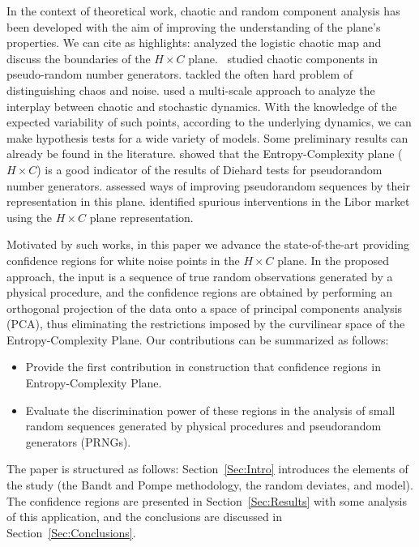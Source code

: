 
In the context of theoretical work, chaotic and random component analysis has been developed with the aim of improving the understanding of the plane's properties. We can cite as highlights:
 analyzed the logistic chaotic map and discuss the boundaries of the $H \times C$ plane.~\citeyear{De_Micco_2009} studied chaotic components in pseudo-random number generators.
  tackled the often hard problem of distinguishing chaos and noise.
 used a multi-scale approach to analyze the interplay between chaotic and stochastic dynamics.
With the knowledge of the expected variability of such points, according to the underlying dynamics, we can make hypothesis tests for a wide variety of models.
Some preliminary results can already be found in the literature.
 showed that the Entropy-Complexity plane ($H\times C$) is a good indicator of the results of Diehard tests for pseudorandom number generators.
 assessed ways of improving pseudorandom sequences by their representation in this plane.
 identified spurious interventions in the Libor market using the $H\times C$ plane representation.

Motivated by such works, in this paper we advance the state-of-the-art providing confidence regions for white noise points in the $H\times C$ plane.
In the proposed approach, the input is a sequence of true random observations generated by a physical procedure, and the confidence regions are obtained by performing an orthogonal projection of the data onto a space of principal components analysis (PCA), thus eliminating the restrictions imposed by the curvilinear space of the Entropy-Complexity Plane.
Our contributions can be summarized as follows:
\begin{itemize}
    \item Provide the first contribution in construction that confidence regions in Entropy-Complexity Plane.
    \item Evaluate the discrimination power of these regions in the analysis of small random sequences generated by physical procedures and pseudorandom generators (PRNGs).
\end{itemize}

The paper is structured as follows: Section~\ref{Sec:Intro} introduces the elements of the study (the Bandt and Pompe methodology, the random deviates, and model).
The confidence regions are presented in Section~\ref{Sec:Results} with some analysis of this application, and the conclusions are discussed in Section~\ref{Sec:Conclusions}.
